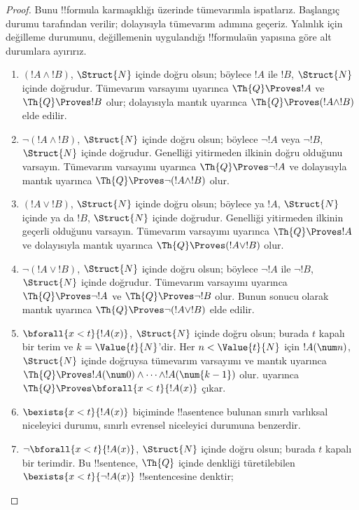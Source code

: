 \documentclass[../../../include/open-logic-section]{subfiles}
\begin{document}
\begin{proof}
Bunu !!{formula} karmaşıklığı üzerinde tümevarımla ispatlarız.
%
Başlangıç durumu  tarafından verilir;
dolayısıyla tümevarım adımına geçeriz. Yalınlık için değilleme durumunu,
değillemenin uygulandığı !!{formula}{}ün yapısına göre alt durumlara ayırırız.

\begin{enumerate}
\item $(!A\land !B)$, $\Struct{N}$ içinde doğru olsun; böylece $!A$ ile
$!B$, $\Struct{N}$ içinde doğrudur. Tümevarım varsayımı uyarınca
$\Th{Q} \Proves !A$ ve $\Th{Q} \Proves !B$ olur; dolayısıyla mantık
uyarınca $\Th{Q} \Proves (!A\land !B)$ elde edilir.
%
\item $\lnot(!A\land !B)$, $\Struct{N}$ içinde doğru olsun; böylece
$\lnot !A$ veya $\lnot !B$, $\Struct{N}$ içinde doğrudur. Genelliği
yitirmeden ilkinin doğru olduğunu varsayın. Tümevarım varsayımı uyarınca
$\Th{Q} \Proves \lnot !A$ ve dolayısıyla mantık uyarınca
$\Th{Q} \Proves \lnot(!A\land !B)$ olur.
%
\item $(!A\lor !B)$, $\Struct{N}$ içinde doğru olsun; böylece ya $!A$,
$\Struct{N}$ içinde ya da $!B$, $\Struct{N}$ içinde doğrudur. Genelliği yitirmeden ilkinin geçerli
olduğunu varsayın. Tümevarım varsayımı uyarınca $\Th{Q} \Proves !A$ ve
dolayısıyla mantık uyarınca $\Th{Q} \Proves (!A\lor !B)$ olur.
%
\item $\lnot(!A\lor !B)$, $\Struct{N}$ içinde doğru olsun; böylece
$\lnot !A$ ile $\lnot !B$, $\Struct{N}$ içinde doğrudur. Tümevarım
varsayımı uyarınca $\Th{Q} \Proves \lnot !A$ ve
$\Th{Q} \Proves \lnot !B$ olur. Bunun sonucu olarak mantık uyarınca
$\Th{Q} \Proves \lnot(!A\lor !B)$ elde edilir.
%
\item $\bforall{x<t}{!A(x)}$, $\Struct{N}$ içinde doğru olsun; burada $t$
kapalı bir terim ve $k=\Value{t}{N}$'dir. Her $n<\Value{t}{N}$ için
$!A(\num n)$, $\Struct{N}$ içinde doğruysa tümevarım varsayımı ve mantık
uyarınca $\Th{Q} \Proves !A(\num 0)\land\dots\land !A(\num{k-1})$ olur.
 uyarınca
$\Th{Q} \Proves \bforall{x<t}{!A(x)}$ çıkar.
%
\item $\bexists{x<t}{!A(x)}$ biçiminde !!a{sentence} bulunan sınırlı
varlıksal niceleyici durumu, sınırlı evrensel niceleyici durumuna benzerdir.
%
\item $\lnot\bforall{x<t}{!A(x)}$, $\Struct{N}$ içinde doğru olsun; burada
$t$ kapalı bir terimdir. Bu !!{sentence}, $\Th{Q}$ içinde denkliği
türetilebilen $\bexists{x<t}{\lnot !A(x)}$ !!{sentence}{}sine denktir;

\end{enumerate}
\end{proof}
\end{document}
